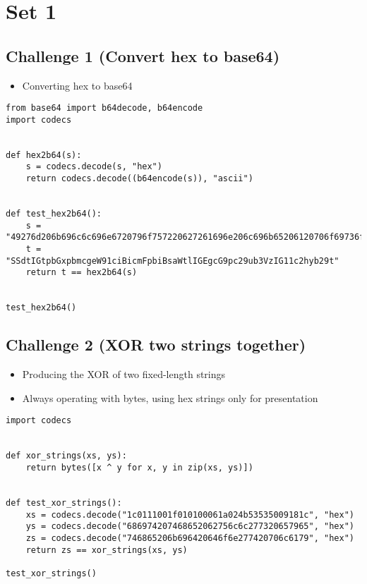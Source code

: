 \documentclass[11pt]{article}
\date{\today}
\title{}
\begin{document}
\tableofcontents

\section{Set 1}
\label{sec:org4c8d814}
\subsection{Challenge 1 (Convert hex to base64)}
\label{sec:orgd384c27}
\begin{itemize}
\item Converting hex to base64
\end{itemize}
\begin{verbatim}
from base64 import b64decode, b64encode
import codecs


def hex2b64(s):
    s = codecs.decode(s, "hex")
    return codecs.decode((b64encode(s)), "ascii")


def test_hex2b64():
    s = "49276d206b696c6c696e6720796f757220627261696e206c696b65206120706f69736f6e6f7573206d757368726f6f6d"
    t = "SSdtIGtpbGxpbmcgeW91ciBicmFpbiBsaWtlIGEgcG9pc29ub3VzIG11c2hyb29t"
    return t == hex2b64(s)


test_hex2b64()
\end{verbatim}

\subsection{Challenge 2 (XOR two strings together)}
\label{sec:orgd8ae2eb}
\begin{itemize}
\item Producing the XOR of two fixed-length strings
\item Always operating with bytes, using hex strings only for presentation
\end{itemize}
\begin{verbatim}
import codecs


def xor_strings(xs, ys):
    return bytes([x ^ y for x, y in zip(xs, ys)])


def test_xor_strings():
    xs = codecs.decode("1c0111001f010100061a024b53535009181c", "hex")
    ys = codecs.decode("686974207468652062756c6c277320657965", "hex")
    zs = codecs.decode("746865206b696420646f6e277420706c6179", "hex")
    return zs == xor_strings(xs, ys)

test_xor_strings()
\end{verbatim}
\end{document}
